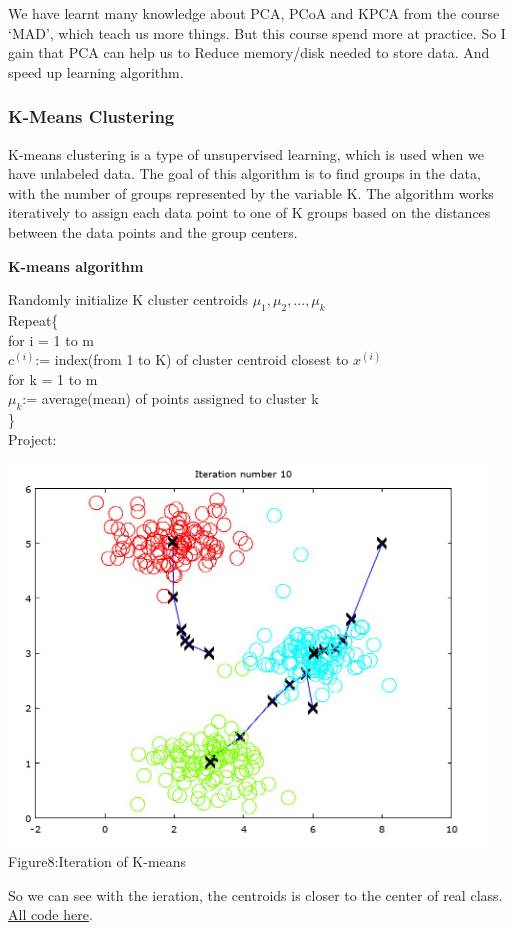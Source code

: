 \documentclass[a4paper]{article}
\begin{document}
{We have learnt many knowledge about PCA, PCoA and KPCA from the course `MAD',  which teach us more things.  But this course spend more at practice. So I gain that  PCA can help us to Reduce memory/disk needed to store data. And speed up learning algorithm.
\subsubsection{\textbf{K-Means Clustering}}
K-means clustering is a type of unsupervised learning, which is used when we have unlabeled data. The goal of this algorithm is to find groups in the data, with the number of groups represented by the variable K. The algorithm works iteratively to assign each data point to one of K groups based on the distances between the data points and the group centers.
\begin{center}
\textbf{K-means algorithm}\\
\end{center}
Randomly initialize K cluster centroids $\mu_1,\mu_2,...,\mu_k$\\
Repeat\{\\
for i = 1 to m\\
	$c^{(i)}$:= index(from 1 to K) of cluster centroid closest to $x^{(i)}$\\
for k = 1 to m\\
		$\mu_k$:= average(mean) of points assigned to cluster k\\
	\}\\
 Project:
 \begin{center}
 \includegraphics[width=5in]{kmean.png}
Figure8:Iteration of K-means
\end{center}
So we can see with the ieration, the centroids is closer to the center of real class. 
\href{https://github.com/GuangYueCHEN/ENSIIE/tree/master/Plus/MachineLearning/machine-learning-ex7}{All code here}.\\
}
\end{document}
